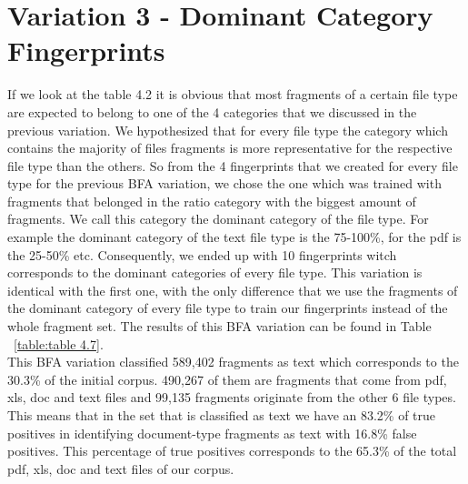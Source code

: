 \section{Variation 3 - Dominant Category Fingerprints}
If we look at the table 4.2 it is obvious that most fragments of a certain file type are expected to belong to one of the 4 categories that we discussed in the previous variation. We hypothesized that for every file type the category which contains the majority of files  fragments is more representative for the respective file type than the others. So from the 4 fingerprints that we created for every file type for the previous BFA variation, we chose the one which was trained with fragments that belonged in the ratio category with the biggest amount of fragments. We call this category the dominant category of the file type. For example the dominant category of the text file type is the 75-100\%, for the pdf is the 25-50\% etc. Consequently, we ended up with 10 fingerprints witch corresponds to the dominant categories of every file type. This variation is identical with the first one, with the only difference that we use the fragments of the dominant category of every file type to train our fingerprints instead of the whole fragment set. The results of this BFA variation can be found in Table ~\ref{table:table 4.7}.\\


 This BFA variation classified 589,402 fragments as text which corresponds to the 30.3\% of the initial corpus. 490,267 of them are fragments that come from pdf, xls, doc and text files and 99,135 fragments originate from the other 6 file types. This means that in the set that is classified as text we have an 83.2\% of true positives in identifying document-type fragments as text with 16.8\% false positives. This percentage of true positives corresponds to the 65.3\% of the total pdf, xls, doc and text files of our corpus.
 

